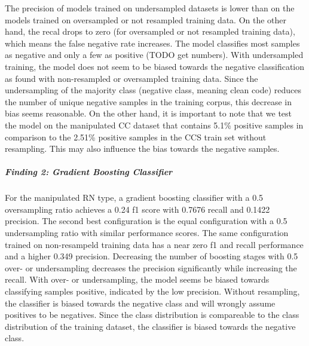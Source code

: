 The precision of models trained on undersampled datasets is lower than on the models trained on oversampled or not resampled training data. On the other hand, the recal drops to zero (for oversampled or not resampled training data), which means the false negative rate increases. The model classifies most samples as negative and only a few as positive (TODO get numbers). With undersampled training, the model does not seem to be biased towards the negative classification as found with non-resampled or oversampled training data. Since the undersampling of the majority class (negative class, meaning clean code) reduces the number of unique negative samples in the training corpus, this decrease in bias seems reasonable. On the other hand, it is important to note that we test the model on the manipulated CC dataset that contains 5.1\% positive samples in comparison to the 2.51\% positive samples in the CCS train set without resampling. This may also influence the bias towards the negative samples.

\subparagraph{Finding 2: Gradient Boosting Classifier}
For the manipulated RN type, a gradient boosting classifier with a 0.5 oversampling ratio achieves a 0.24 f1 score with 0.7676 recall and 0.1422 precision. The second best configuration is the equal configuration with a 0.5 undersampling ratio with similar performance scores. The same configuration trained on non-resampeld training data has a near zero f1 and recall performance and a higher 0.349 precision. Decreasing the number of boosting stages with 0.5 over- or undersampling decreases the precision significantly while increasing the recall.
With over- or undersampling, the model seems be biased towards classifying samples positive, indicated by the low precision. Without resampling, the classifier is biased towards the negative class and will wrongly assume positives to be negatives. Since the class distribution is compareable to the class distribution of the training dataset, the classifier is biased towards the negative class.

